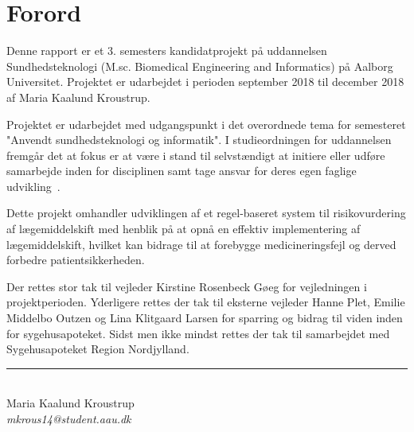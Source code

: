 \chapter*{Forord}
Denne rapport er et 3. semesters kandidatprojekt på uddannelsen Sundhedsteknologi (M.sc. Biomedical Engineering and Informatics) på Aalborg Universitet. Projektet er udarbejdet i perioden september 2018 til december 2018 af Maria Kaalund Kroustrup. 

Projektet er udarbejdet med udgangspunkt i det overordnede tema for semesteret "Anvendt sundhedsteknologi og informatik". I studieordningen for uddannelsen fremgår det at fokus er at være i stand til selvstændigt at initiere eller udføre samarbejde inden for disciplinen samt tage ansvar for deres egen faglige udvikling~\citep{Studieordning2011}. 

Dette projekt omhandler udviklingen af et regel-baseret system til risikovurdering af lægemiddelskift med henblik på at opnå en effektiv implementering af lægemiddelskift, hvilket kan bidrage til at forebygge medicineringsfejl og derved forbedre patientsikkerheden. 

Der rettes stor tak til vejleder Kirstine Rosenbeck Gøeg for vejledningen i projektperioden. Yderligere rettes der tak til eksterne vejleder Hanne Plet, Emilie Middelbo Outzen og Lina Klitgaard Larsen for sparring og bidrag til viden inden for sygehusapoteket. Sidst men ikke mindst rettes der tak til samarbejdet med Sygehusapoteket Region Nordjylland. 

\vspace{1.5cm}
\begin{center}
\rule{6cm}{0.4pt} \\
Maria Kaalund Kroustrup \\
\textit{mkrous14@student.aau.dk}
\end{center}